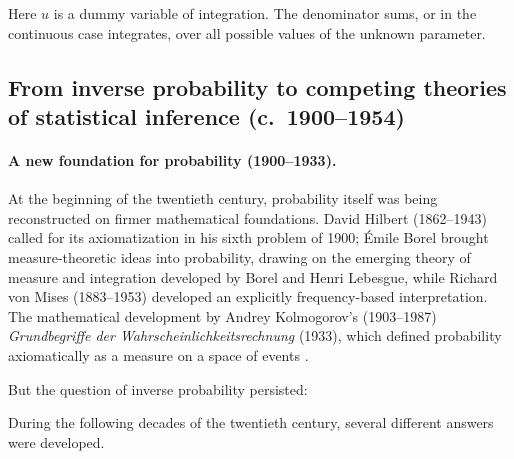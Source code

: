 Here $u$ is a dummy variable of integration. The denominator sums, or in the
continuous case integrates, over all possible values of the unknown
parameter.

\subsection{From inverse probability to competing theories of statistical inference
(c.~1900--1954)}

\paragraph{A new foundation for probability (1900--1933).}

At the beginning of the twentieth century, probability itself was being
reconstructed on firmer mathematical foundations. David Hilbert
(1862--1943) called for its axiomatization in his sixth problem of 1900; Émile Borel brought measure-theoretic ideas into probability, drawing on the emerging theory of measure and integration developed by Borel and Henri Lebesgue, while Richard von Mises (1883--1953)
developed an explicitly frequency-based interpretation. The mathematical development by Andrey Kolmogorov's (1903--1987)
\textit{Grundbegriffe der Wahrscheinlichkeitsrechnung} (1933), which defined
probability axiomatically as a measure on a space of events
\cite{hilbert1900,BorelEmile1909,vonmisesss1919,kolmogorovaudrey1933}.

\noindent
But the question of inverse probability persisted:

\begin{center}
{\setlength{\fboxsep}{10pt}
}
\end{center}

\noindent
During the following decades of the twentieth century, several different answers were developed.

